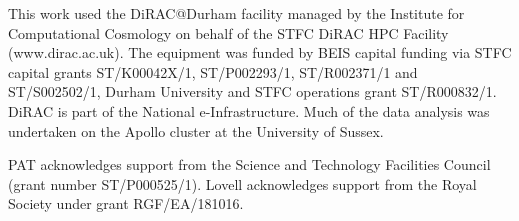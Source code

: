 \documentclass[fleqn,usenatbib]{mnras}
\begin{document}
This work used the DiRAC@Durham facility managed by the Institute for Computational Cosmology on behalf of the STFC DiRAC HPC Facility (www.dirac.ac.uk).
The equipment was funded by BEIS capital funding via STFC capital grants ST/K00042X/1, ST/P002293/1, ST/R002371/1 and ST/S002502/1, Durham University and STFC operations grant ST/R000832/1.
DiRAC is part of the National e-Infrastructure.
Much of the data analysis was undertaken on the {\sc Apollo} cluster at the University of Sussex.

PAT %
acknowledges support from the Science and Technology Facilities Council (grant
number ST/P000525/1).
Lovell acknowledges support from the Royal Society under grant RGF/EA/181016.






\appendix







\bsp	%
\label{lastpage}
\end{document}
